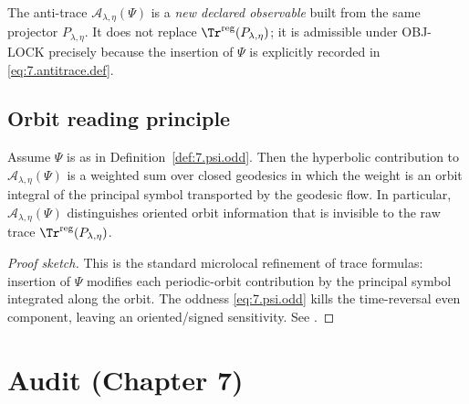 \begin{remark}\label{rem:7.antitrace.objlock}
The anti-trace $\mathcal A_{\lambda,\eta}(\Psi)$ is a \emph{new declared observable} built from the same projector $P_{\lambda,\eta}$.
It does not replace $\Tr^{\mathrm{reg}}(P_{\lambda,\eta})$; it is admissible under OBJ-LOCK precisely because the insertion of $\Psi$
is explicitly recorded in \eqref{eq:7.antitrace.def}.
\end{remark}

\subsection{Orbit reading principle}\label{subsec:ch7-orbit-reading}

\begin{proposition}\label{prop:7.orbit.reading}
Assume $\Psi$ is as in Definition~\ref{def:7.psi.odd}. Then the hyperbolic contribution to $\mathcal A_{\lambda,\eta}(\Psi)$ is a weighted
sum over closed geodesics in which the weight is an orbit integral of the principal symbol transported by the geodesic flow.
In particular, $\mathcal A_{\lambda,\eta}(\Psi)$ distinguishes oriented orbit information that is invisible to the raw trace
$\Tr^{\mathrm{reg}}(P_{\lambda,\eta})$.
\end{proposition}

\begin{proof}[Proof sketch]
This is the standard microlocal refinement of trace formulas: insertion of $\Psi$ modifies each periodic-orbit contribution by the principal
symbol integrated along the orbit. The oddness \eqref{eq:7.psi.odd} kills the time-reversal even component, leaving an oriented/signed sensitivity.
See \cite{DuistermaatGuillemin1975,DyatlovZworski2019}.
\end{proof}

\section*{Audit (Chapter 7)}\label{sec:ch7-audit}

